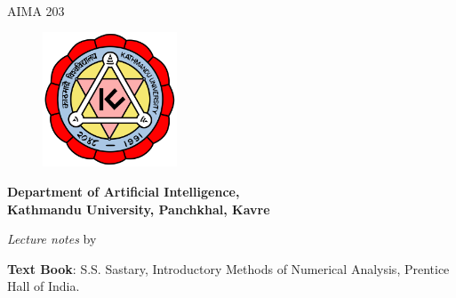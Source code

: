 \vspace*{2cm}
{\begin{center}
  {\Huge
    {\bfseries {\thetitle}}} \\
        \vspace{5mm}
        {\large AIMA 203}
  \vspace{3cm}

\begin{figure}[h]
	\centering
	\includegraphics[height=4cm,width=4cm]{images/Kulogo.png}
\end{figure}

\vspace{1cm}

	{\large \bfseries Department of Artificial Intelligence, \\[1mm]
 Kathmandu University, Panchkhal, Kavre}

\vspace{2cm}
        \textit{Lecture notes}
	by\\
	{\bfseries  \theauthor}

\vspace{1cm}

    \textbf{Text Book}: S.S. Sastary, Introductory Methods of Numerical Analysis, Prentice Hall of India.
    \vspace{1.5cm}

{\thedate}

\thispagestyle{empty}
\end{center}}


\clearpage
